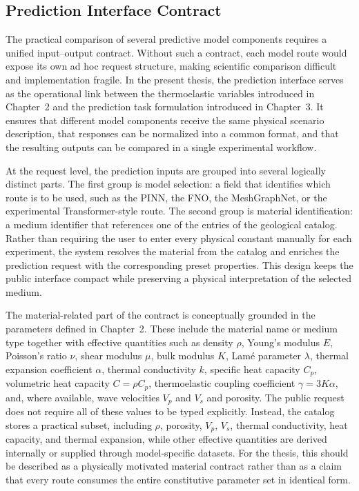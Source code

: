 \subsection{Prediction Interface Contract}

The practical comparison of several predictive model components requires a unified input--output contract. Without such a contract, each model route would expose its own ad hoc request structure, making scientific comparison difficult and implementation fragile. In the present thesis, the prediction interface serves as the operational link between the thermoelastic variables introduced in Chapter~2 and the prediction task formulation introduced in Chapter~3. It ensures that different model components receive the same physical scenario description, that responses can be normalized into a common format, and that the resulting outputs can be compared in a single experimental workflow.

At the request level, the prediction inputs are grouped into several logically distinct parts. The first group is model selection: a field that identifies which route is to be used, such as the PINN, the FNO, the MeshGraphNet, or the experimental Transformer-style route. The second group is material identification: a medium identifier that references one of the entries of the geological catalog. Rather than requiring the user to enter every physical constant manually for each experiment, the system resolves the material from the catalog and enriches the prediction request with the corresponding preset properties. This design keeps the public interface compact while preserving a physical interpretation of the selected medium.

The material-related part of the contract is conceptually grounded in the parameters defined in Chapter~2. These include the material name or medium type together with effective quantities such as density \(\rho\), Young's modulus \(E\), Poisson's ratio \(\nu\), shear modulus \(\mu\), bulk modulus \(K\), Lam\'e parameter \(\lambda\), thermal expansion coefficient \(\alpha\), thermal conductivity \(k\), specific heat capacity \(C_p\), volumetric heat capacity \(C=\rho C_p\), thermoelastic coupling coefficient \(\gamma=3K\alpha\), and, where available, wave velocities \(V_p\) and \(V_s\) and porosity. The public request does not require all of these values to be typed explicitly. Instead, the catalog stores a practical subset, including \(\rho\), porosity, \(V_p\), \(V_s\), thermal conductivity, heat capacity, and thermal expansion, while other effective quantities are derived internally or supplied through model-specific datasets. For the thesis, this should be described as a physically motivated material contract rather than as a claim that every route consumes the entire constitutive parameter set in identical form.

